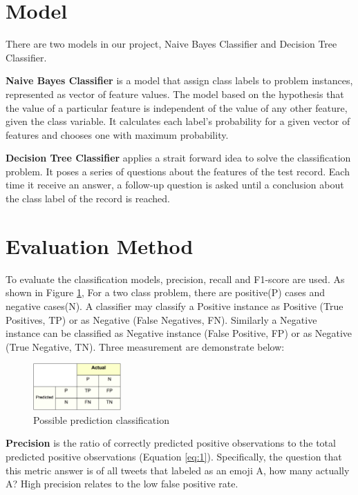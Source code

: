 \documentclass[11pt]{article}
\begin{document}
\section{Model}

There are two models in our project, Naive Bayes Classifier and Decision Tree Classifier.

\noindent\textbf{Naive Bayes Classifier} is a model that assign class labels to problem instances, represented as vector of feature values. The model based on the hypothesis that the value of a particular feature is independent of the value of any other feature, given the class variable. It calculates each label's probability for a given vector of features and chooses one with maximum probability.

\noindent\textbf{Decision Tree Classifier} applies a strait forward idea to solve the classification problem. It poses a series of questions about the features of the test record. Each time it receive an answer, a follow-up question is asked until a conclusion about the class label of the record is reached.


\section{Evaluation Method}

To evaluate the classification models, precision, recall and F1-score are used. As shown in Figure \ref{fig:1}, For a two class problem, there are positive(P) cases and negative cases(N). A classifier may classify a Positive instance as Positive (True Positives, TP) or as Negative (False Negatives, FN). Similarly a Negative instance can be classified as Negative instance (False Positive, FP) or as Negative (True Negative, TN).  Three measurement are demonstrate below: 

\begin{figure}[h]
	\centering
	\includegraphics[width=0.3\textwidth]{img/img1}
	\caption{Possible prediction classification}
	\label{fig:1}
\end{figure}

\noindent\textbf{Precision} is the ratio of correctly predicted positive observations to the total predicted positive observations (Equation \ref{eq:1}). Specifically, the question that this metric answer is of all tweets that labeled as an emoji A, how many actually A? High precision relates to the low false positive rate.
\end{document}
